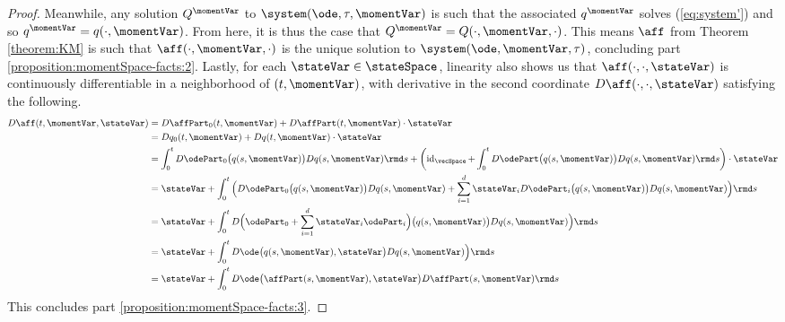 \begin{proof}
  Meanwhile, any solution $Q^\momentVar$ to $\system(\ode,\tau,\momentVar)$ is such that the associated $q^\momentVar$ solves (\ref{eq:system'}) and so $q^\momentVar = q(\cdot,\momentVar)$.
  From here, it is thus the case that $Q^\momentVar = Q(\cdot,\momentVar,\cdot)$.
  This means $\aff$ from Theorem \ref{theorem:KM} is such that $\aff(\cdot,\momentVar,\cdot)$ is the unique solution to $\system(\ode,\momentVar,\tau)$, concluding part \ref{proposition:momentSpace-facts:2}.
  Lastly, for each $\stateVar\in\stateSpace$, linearity also shows us that $\aff(\cdot,\cdot,\stateVar)$ is continuously differentiable in a neighborhood of $(t, \momentVar)$, with derivative in the second coordinate $D\aff(\cdot,\cdot,\stateVar)$ satisfying the following.
  \begin{align}
    D\aff(t,\momentVar,\stateVar)
    &= D\affPart_0(t,\momentVar) + D\affPart(t,\momentVar)\cdot\stateVar \\
    &= D q_0(t,\momentVar) + Dq(t,\momentVar)\cdot\stateVar \\
    &= \int_0^t D\odePart_0\big(q(s,\momentVar)\big) Dq(s,\momentVar) \rmd s + \left(\operatorname{id}_\vecSpace + \int_0^t D\odePart\big(q(s,\momentVar)\big)D q(s,\momentVar) \rmd s\right)\cdot\stateVar \\
    &= \stateVar + \int_0^t \Big( D\odePart_0\big(q(s,\momentVar) \big) Dq(s,\momentVar) + \sum_{i=1}^d \stateVar_i D\odePart_i\big(q(s,\momentVar) \big) Dq(s,\momentVar) \Big) \rmd s \\
    &= \stateVar + \int_0^t D\Big( \odePart_0 + \sum_{i=1}^d \stateVar_i \odePart_i \Big)\big(q(s,\momentVar)\big) Dq(s,\momentVar) \Big) \rmd s \\
    &= \stateVar + \int_0^t D\ode\big(q(s,\momentVar), \stateVar\big) Dq(s,\momentVar) \Big) \rmd s \\
    &= \stateVar + \int_0^t D\ode\big(\affPart(s,\momentVar), \stateVar\big) D\affPart(s,\momentVar) \rmd s 
  \end{align}
  This concludes part \ref{proposition:momentSpace-facts:3}.
\end{proof}
